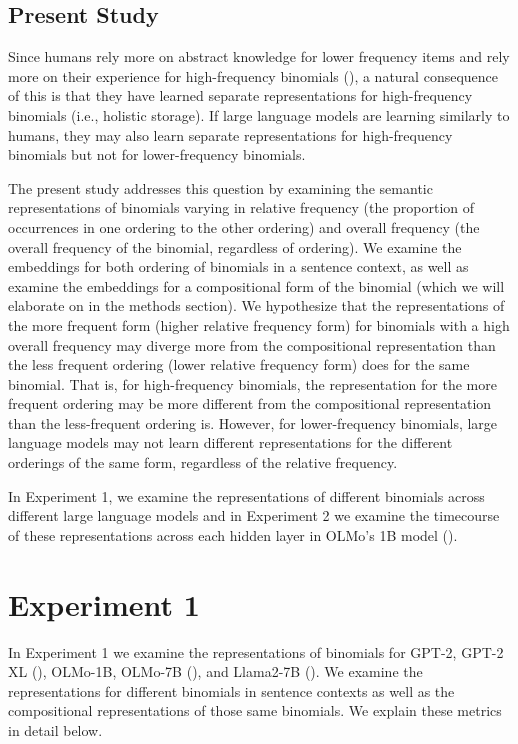 \documentclass[
  12pt,
  letterpaper,
]{scrreprt}
\begin{document}
\subsection{Present Study}\label{present-study-2}

Since humans rely more on abstract knowledge for lower frequency items
and rely more on their experience for high-frequency binomials
(), a natural consequence
of this is that they have learned separate representations for
high-frequency binomials (i.e., holistic storage). If large language
models are learning similarly to humans, they may also learn separate
representations for high-frequency binomials but not for lower-frequency
binomials.

The present study addresses this question by examining the semantic
representations of binomials varying in relative frequency (the
proportion of occurrences in one ordering to the other ordering) and
overall frequency (the overall frequency of the binomial, regardless of
ordering). We examine the embeddings for both ordering of binomials in a
sentence context, as well as examine the embeddings for a compositional
form of the binomial (which we will elaborate on in the methods
section). We hypothesize that the representations of the more frequent
form (higher relative frequency form) for binomials with a high overall
frequency may diverge more from the compositional representation than
the less frequent ordering (lower relative frequency form) does for the
same binomial. That is, for high-frequency binomials, the representation
for the more frequent ordering may be more different from the
compositional representation than the less-frequent ordering is.
However, for lower-frequency binomials, large language models may not
learn different representations for the different orderings of the same
form, regardless of the relative frequency.

In Experiment 1, we examine the representations of different binomials
across different large language models and in Experiment 2 we examine
the timecourse of these representations across each hidden layer in
OLMo's 1B model
().

\section{Experiment 1}\label{experiment-1-2}

In Experiment 1 we examine the representations of binomials for GPT-2,
GPT-2 XL (), OLMo-1B, OLMo-7B
(), and Llama2-7B (). We examine the representations for different binomials in
sentence contexts as well as the compositional representations of those
same binomials. We explain these metrics in detail below.
\end{document}
